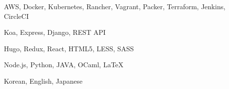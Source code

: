 

\begin{cvskills}

	{AWS, Docker, Kubernetes, Rancher, Vagrant, Packer, Terraform, Jenkins, CircleCI} %

	{Koa, Express, Django, REST API} %

	{Hugo, Redux, React, HTML5, LESS, SASS} %

	{Node.js, Python, JAVA, OCaml, LaTeX} %

	{Korean, English, Japanese} %

\end{cvskills}
